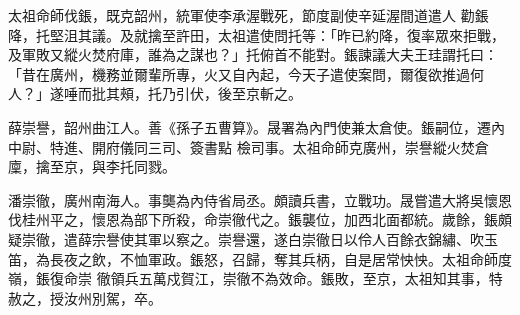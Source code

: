 \begin{pinyinscope}
 太祖命師伐鋹，既克韶州，統軍使李承渥戰死，節度副使辛延渥間道遣人
 勸鋹降，托堅沮其議。及就擒至許田，太祖遣使問托等：「昨已約降，復率眾來拒戰，及軍敗又縱火焚府庫，誰為之謀也？」托俯首不能對。鋹諫議大夫王珪謂托曰：「昔在廣州，機務並爾輩所專，火又自內起，今天子遣使案問，爾復欲推過何人？」遂唾而批其頰，托乃引伏，後至京斬之。



 薛崇譽，韶州曲江人。善《孫子五曹算》。晟署為內門使兼太倉使。鋹嗣位，遷內中尉、特進、開府儀同三司、簽書點
 檢司事。太祖命師克廣州，崇譽縱火焚倉廩，擒至京，與李托同戮。



 潘崇徹，廣州南海人。事龑為內侍省局丞。頗讀兵書，立戰功。晟嘗遣大將吳懷恩伐桂州平之，懷恩為部下所殺，命崇徹代之。鋹襲位，加西北面都統。歲餘，鋹頗疑崇徹，遣薛宗譽使其軍以察之。崇譽還，遂白崇徹日以伶人百餘衣錦繡、吹玉笛，為長夜之飲，不恤軍政。鋹怒，召歸，奪其兵柄，自是居常怏怏。太祖命師度嶺，鋹復命崇
 徹領兵五萬戍賀江，崇徹不為效命。鋹敗，至京，太祖知其事，特赦之，授汝州別駕，卒。



\end{pinyinscope}